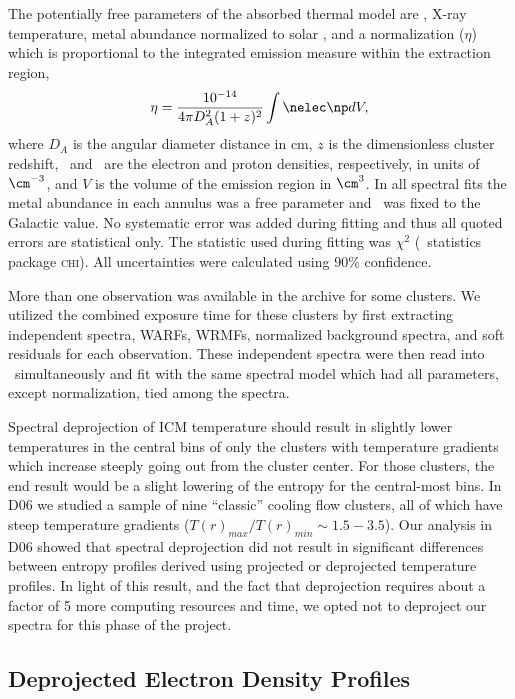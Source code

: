 The potentially free parameters of the absorbed thermal model are
\nhi, X-ray temperature, metal abundance normalized to solar
\citep[heavy-element ratios taken from][]{ag89}, and a normalization
($\eta$) which is proportional to the integrated emission measure
within the extraction region,
\begin{equation}
\label{eqn:norm}
\eta = \frac{10^{-14}}{4\pi D_A^2(1+z)^2}\int \nelec \np dV,
\end{equation}
where $D_A$ is the angular diameter distance in cm, $z$ is the
dimensionless cluster redshift, \nelec\ and \np\ are the electron and
proton densities, respectively, in units of $\cm^{-3}$, and $V$ is the
volume of the emission region in $\cm^3$. In all spectral fits the
metal abundance in each annulus was a free parameter and \nhi\ was
fixed to the Galactic value. No systematic error was added during
fitting and thus all quoted errors are statistical only. The statistic
used during fitting was $\chi^2$ (\xspec\ statistics package
\textsc{chi}). All uncertainties were calculated using 90\%
confidence.

More than one observation was available in the archive for some
clusters. We utilized the combined exposure time for these clusters by
first extracting independent spectra, WARFs, WRMFs, normalized
background spectra, and soft residuals for each observation. These
independent spectra were then read into \xspec\ simultaneously and fit
with the same spectral model which had all parameters, except
normalization, tied among the spectra.

Spectral deprojection of ICM temperature should result in slightly
lower temperatures in the central bins of only the clusters with
temperature gradients which increase steeply going out from the
cluster center. For those clusters, the end result would be a slight
lowering of the entropy for the central-most bins. In D06 we studied a
sample of nine ``classic'' cooling flow clusters, all of which have
steep temperature gradients ($T(r)_{max}/T(r)_{min} \sim
1.5-3.5$). Our analysis in D06 showed that spectral deprojection did
not result in significant differences between entropy profiles derived
using projected or deprojected temperature profiles. In light of this
result, and the fact that deprojection requires about a factor of 5
more computing resources and time, we opted not to deproject our
spectra for this phase of the project.

\subsection{Deprojected Electron Density Profiles}
\label{sec:entsuppdene}

